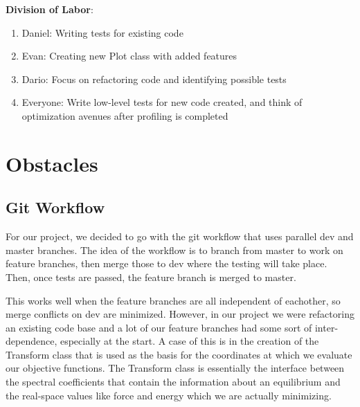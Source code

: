 \documentclass{article}
\begin{document}
\textbf{Division of Labor}:
\begin{enumerate}
\item Daniel: Writing tests for existing code
\item Evan: Creating new Plot class with added features
\item Dario: Focus on refactoring code and identifying possible tests
\item Everyone: Write low-level tests for new code created, and think of optimization avenues after profiling is completed
\end{enumerate}



\section{Obstacles}%

\subsection{Git Workflow}

For our project, we decided to go with the git workflow that uses parallel dev and master branches.
The idea of the workflow is to branch from master to work on feature branches, then merge those to dev where the testing will take place.
Then, once tests are passed, the feature branch is merged to master.

This works well when the feature branches are all independent of eachother, so merge conflicts on dev are minimized.
However, in our project we were refactoring an existing code base and a lot of our feature branches had some sort of inter-dependence, especially at the start.
A case of this is in the creation of the Transform class that is used as the basis for the coordinates at which we evaluate our objective functions.
The Transform class is essentially the interface between the spectral coefficients that contain the information about an equilibrium and the real-space values like force and energy which we are actually minimizing.


\printbibliography
\end{document}
